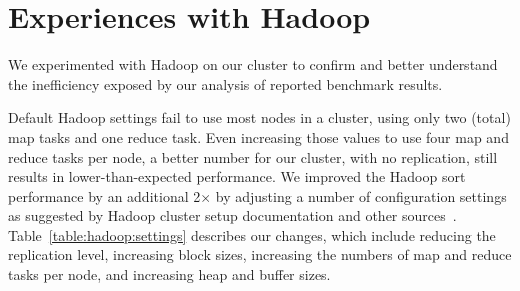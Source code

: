 \section{Experiences with Hadoop}
\label{sec:hadoop}

We experimented with Hadoop on our cluster to confirm and better
understand the inefficiency exposed by our analysis of reported
benchmark results.


 Default Hadoop settings fail
to use most nodes in a cluster, using only two (total) map tasks and
one reduce task.  Even increasing those values to use four map and
reduce tasks per node, a better number for our cluster, with no
replication, still results in lower-than-expected performance.  We improved
the Hadoop sort performance by an additional 2$\times$ by adjusting a
number of configuration settings as suggested by Hadoop cluster setup
documentation and other
sources~\cite{hadoopsetup,hadoopsetup2,hadoopsetup3}.
Table~\ref{table:hadoop:settings} describes our changes, which
include reducing the replication level, increasing block sizes,
increasing the numbers of map and reduce tasks per node, and increasing
heap and buffer sizes.


